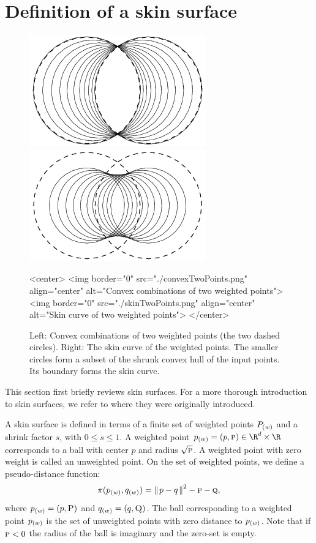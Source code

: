 
\section{Definition of a skin surface}
\label{sec:skindefinition}

\begin{figure}
  \begin{ccTexOnly}
    \begin{center}
      \includegraphics[width=.25\textwidth]{Skin_surface_3/convexTwoPoints}
      \includegraphics[width=.25\textwidth]{Skin_surface_3/skinTwoPoints}
    \end{center}
  \end{ccTexOnly}
  \begin{ccHtmlOnly}
    <center>
    <img border="0" src="./convexTwoPoints.png" align="center" alt="Convex combinations of two weighted points">
    <img border="0" src="./skinTwoPoints.png" align="center" alt="Skin
    curve of two weighted points">
    </center>
  \end{ccHtmlOnly}
  \caption{\label{fig:twoPoints} Left: Convex combinations of two
    weighted points (the two dashed circles). Right: The skin curve of
    the weighted points. The smaller circles form a subset of the
    shrunk convex hull of the input points. Its boundary forms the
    skin curve. }
\end{figure}

This section first briefly reviews skin surfaces. For a more thorough
introduction to skin surfaces, we refer to \cite{cgal:e-dssd-99} where
they were originally introduced.

A skin surface is defined in terms of a finite set of weighted points
${P}_{(w)}$ and a shrink factor $s$, with $0\leq s\leq 1$. A weighted
point $\ssWpoint{p}=({p},\textsc{p})\in \R^d\times\R$ corresponds to a ball
with center ${p}$ and radius $\sqrt{\textsc{p}}$. A weighted point
with zero weight is called an unweighted point. On the set of weighted
points, we define a pseudo-distance function:
\[
  \pi({p}_{(w)},{q}_{(w)}) = {\parallel\! p-q \!\parallel}^2 - \textsc{p} - \textsc{q},
\]
where ${p}_{(w)} = (p,\textsc{P})$ and ${q}_{(w)} = (q,\textsc{Q})$.  The
ball corresponding to a weighted point ${p}_{(w)}$ is the set of
unweighted points with zero distance to ${p}_{(w)}$. Note that if
$\textsc{p}<0$ the radius of the ball is imaginary and the zero-set is
empty.


